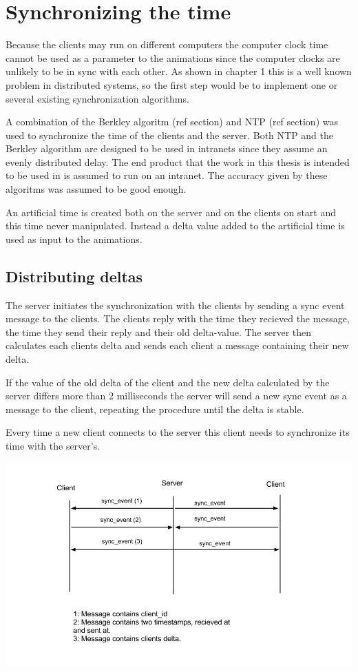 \section{Synchronizing the time}

Because the clients may run on different computers the computer clock time cannot be used as a parameter to the animations since the computer clocks are unlikely to be in sync with each other. As shown in chapter 1 this is a well known problem in distributed systems, so the first step would be to implement one or several existing synchronization algorithms. 

A combination of the Berkley algoritm (ref section) and NTP (ref section) was used to synchronize the time of the clients and the server. Both NTP and the Berkley algorithm are designed to be used in intranets since they assume an evenly distributed delay. The end product that the work in this thesis is intended to be used in is assumed to run on an intranet. The accuracy given by these algoritms was assumed to be good enough. 

An artificial time is created both on the server and on the clients on start and this time never manipulated. Instead a delta value added to the artificial time is used as input to the animations.  

\subsection {Distributing deltas}

The server initiates the synchronization with the clients by sending a sync event message to the clients. The clients reply with the time they recieved the message, the time they send their reply and their old delta-value. The server then calculates each clients delta and sends each client a message containing their new delta. 

If the value of the old delta of the client and the new delta calculated by the server differs more than 2 milliseconds the server will send a new sync event as a message to the client, repeating the procedure until the delta is stable. 

Every time a new client connects to the server this client needs to synchronize its time with the server's. 

\includegraphics[width=1.0\textwidth]{figures/comm.png}


